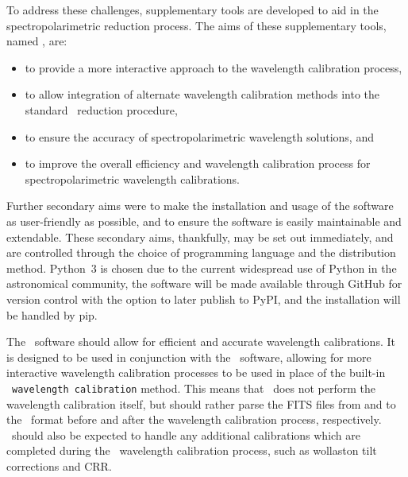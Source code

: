 To address these challenges, supplementary tools are developed to aid in the spectro\-polarimetric reduction process.
The aims of these supplementary tools, named \stops, are:
\begin{itemize}
    \item to provide a more interactive approach to the wavelength calibration process,
    \item to allow integration of alternate wavelength calibration methods into the standard \polsalt\ reduction procedure,
    \item to ensure the accuracy of spectropolarimetric wavelength solutions, and
    \item to improve the overall efficiency and wavelength calibration process for spectro\-polarimetric wavelength calibrations.
\end{itemize}
Further secondary aims were to make the installation and usage of the software as user-friendly as possible, and to ensure the software is easily maintainable and extendable.
These secondary aims, thankfully, may be set out immediately, and are controlled through the choice of programming language and the distribution method.
Python~$3$ is chosen due to the current widespread use of Python in the astronomical community, the software will be made available through GitHub for version control with the option to later publish to \gls{PyPI}, and the installation will be handled by pip.

The \stops\ software should allow for efficient and accurate wavelength calibrations.
It is designed to be used in conjunction with the \polsalt\ software, allowing for more interactive wavelength calibration processes to be used in place of the built-in \polsalt\ \texttt{wavelength calibration} method.
This means that \stops\ does not perform the wavelength calibration itself, but should rather parse the \gls{FITS} files from and to the \polsalt\ format before and after the wavelength calibration process, respectively.
\stops\ should also be expected to handle any additional calibrations which are completed during the \polsalt\ wavelength calibration process, such as wollaston tilt corrections and \gls{CRR}.


